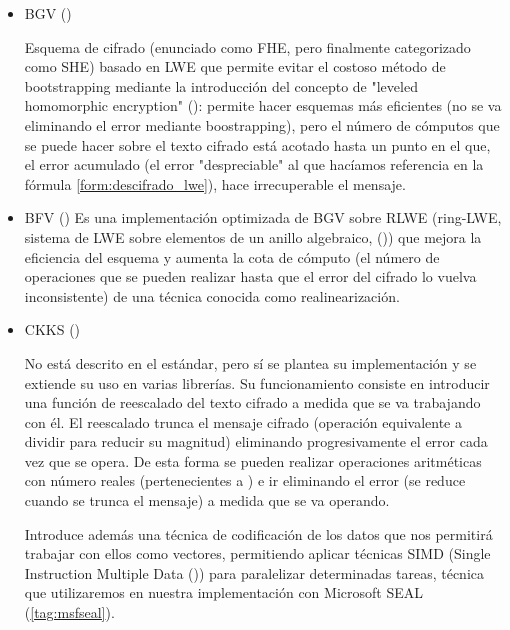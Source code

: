 \begin{itemize}

    \item BGV (\cite{brakerski_leveled_2012})

    Esquema de cifrado (enunciado como FHE, pero finalmente categorizado como SHE) basado en LWE que permite evitar el costoso método de bootstrapping mediante la introducción del concepto de "leveled homomorphic encryption" (\cite{noauthor_homomorphic_nodate-3}): permite hacer esquemas más eficientes (no se va eliminando el error mediante boostrapping), pero el número de cómputos que se puede hacer sobre el texto cifrado está acotado hasta un punto en el que, el error acumulado (el error "despreciable" al que hacíamos referencia en la fórmula \ref{form:descifrado_lwe}), hace irrecuperable el mensaje.


    \item BFV (\cite{fan_somewhat_2012})
    \label{tag:bfv}
    Es una implementación optimizada de BGV sobre RLWE (ring-LWE, sistema de LWE sobre elementos de un anillo algebraico, (\cite{wikipedia_contributors._anillo_2019})) que mejora la eficiencia del esquema y aumenta la cota de cómputo (el número de operaciones que se pueden realizar hasta que el error del cifrado lo vuelva inconsistente) de una técnica conocida como realinearización.


    \item CKKS (\cite{cheon_homomorphic_2017})
    \label{tag:ckks}

    No está descrito en el estándar, pero sí se plantea su implementación y se extiende su uso en varias librerías. Su funcionamiento consiste en introducir una función de reescalado del texto cifrado a medida que se va trabajando con él. El reescalado trunca el mensaje cifrado (operación equivalente a dividir para reducir su magnitud) eliminando progresivamente el error cada vez que se opera. De esta forma se pueden realizar operaciones aritméticas con número reales (pertenecientes a ) e ir eliminando el error (se reduce cuando se trunca el mensaje) a medida que se va operando.

    Introduce además una técnica de codificación de los datos que nos permitirá trabajar con ellos como vectores, permitiendo aplicar técnicas SIMD (Single Instruction Multiple Data (\cite{wikipedia_contributors._simd_2017})) para paralelizar determinadas tareas, técnica que utilizaremos en nuestra implementación con Microsoft SEAL (\ref{tag:msfseal}).

\end{itemize}

